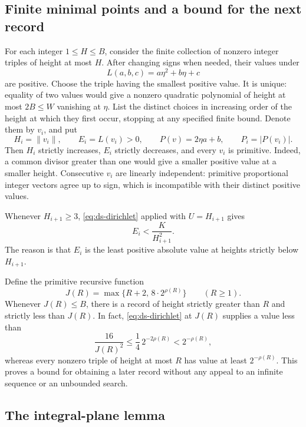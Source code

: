 \subsection{Finite minimal points and a bound for the next record}

For each integer $1\leq H\leq B$, consider the finite collection of nonzero
integer triples of height at most $H$.  After changing signs when needed,
their values under
\[
 L(a,b,c)=a\eta^2+b\eta+c
\]
are positive.  Choose the triple having the smallest positive value.
It is unique: equality of two values would give a nonzero quadratic
polynomial of height at most $2B\leq W$ vanishing at $\eta$.  List the distinct choices in increasing
order of the height at which they first occur, stopping at any specified
finite bound.  Denote them by $v_i$, and put
\[
 H_i=\|v_i\|,\qquad E_i=L(v_i)>0,\qquad
 P(v)=2\eta a+b,\qquad P_i=|P(v_i)|.
\]
Then $H_i$ strictly increases, $E_i$ strictly decreases, and every $v_i$
is primitive.  Indeed, a common divisor greater than one would give a
smaller positive value at a smaller height.  Consecutive $v_i$ are linearly
independent: primitive proportional integer vectors agree up to sign,
which is incompatible with their distinct positive values.

Whenever $H_{i+1}\geq3$, \eqref{eq:ds-dirichlet} applied with
$U=H_{i+1}$ gives
\begin{equation}\label{eq:ds-record-estimate}
 E_i<\frac{K}{H_{i+1}^2}.
\end{equation}
The reason is that $E_i$ is the least positive absolute value at heights
strictly below $H_{i+1}$.

Define the primitive recursive function
\begin{equation}\label{eq:ds-jump}
 J(R)=\max\{R+2,\,8\cdot2^{\rho(R)}\}\qquad(R\geq1).
\end{equation}
Whenever $J(R)\leq B$, there is a record of height strictly greater
than $R$ and strictly less than $J(R)$.  In fact, \eqref{eq:ds-dirichlet} at $J(R)$ supplies a value
less than
\[
 \frac{16}{J(R)^2}\leq\frac14\,2^{-2\rho(R)}
 <2^{-\rho(R)},
\]
whereas every nonzero triple of height at most $R$ has value at least
$2^{-\rho(R)}$.  This proves a bound for obtaining a later record without
any appeal to an infinite sequence or an unbounded search.

\subsection{The integral-plane lemma}

